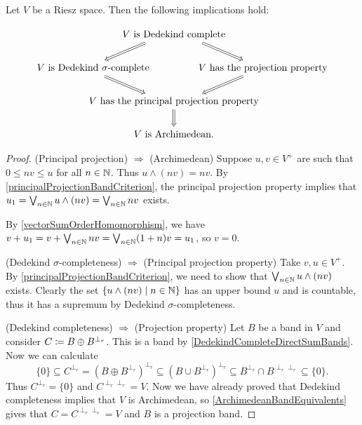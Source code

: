 \begin{proposition}
Let $V$ be a Riesz space. Then the following implications hold:

\[ \begin{tikzcd}[column sep=0]
& \text{$V$ is Dedekind complete} \ar[dl, Rightarrow, end anchor={[xshift=2em]north east}] \ar[dr, Rightarrow, end anchor={[xshift = -2em]north west}] & \\
\text{$V$ is Dedekind $\sigma$-complete} \hspace{-7em} \ar[dr, Rightarrow, start anchor={[xshift=2em]south east}] && \hspace{-7em} \text{$V$ has the projection property} \ar[dl, Rightarrow, start anchor={[xshift=-2em]south west}] \\
& \text{$V$ has the principal projection property} \ar[d, Rightarrow] & \\
& \text{$V$ is Archimedean.} &
\end{tikzcd} \]
\end{proposition}
\begin{proof}
(Principal projection) $\Rightarrow$ (Archimedean) Suppose $u,v\in V^+$ are such that $0\leq nv \leq u$ for all $n\in \mathbb{N}$. Thus $u\wedge (nv) = nv$. By \ref{principalProjectionBandCriterion}, the principal projection property implies that $u_1 = \bigvee_{n\in \mathbb{N}} u\wedge (nv) = \bigvee_{n\in \mathbb{N}}nv$ exists.

By \ref{vectorSumOrderHomomorphism}, we have $v+ u_1 = v+\bigvee_{n\in \mathbb{N}}nv = \bigvee_{n\in \mathbb{N}}(1+n)v = u_1$, so $v = 0$.

(Dedekind $\sigma$-completeness) $\Rightarrow$ (Principal projection property) Take $v, u\in V^+$. By \ref{principalProjectionBandCriterion}, we need to show that $\bigvee_{n\in\mathbb{N}}u\wedge (nv)$ exists. Clearly the set $\setbuilder{u\wedge (nv)}{n\in \N}$ has an upper bound $u$ and is countable, thus it has a supremum by Dedekind $\sigma$-completeness.

(Dedekind completeness) $\Rightarrow$ (Projection property) Let $B$ be a band in $V$ and consider $C \coloneqq B \oplus B^{\perp_r}$. This is a band by \ref{DedekindCompleteDirectSumBands}. Now we can calculate
\[ \{0\} \subseteq C^{\perp_r} = (B\oplus B^{\perp_r})^{\perp_r} \subseteq (B\cup B^{\perp_r})^{\perp_r} \subseteq B^{\perp_r} \cap B^{\perp_r\perp_r} \subseteq \{0\}. \]
Thus $C^{\perp_r} = \{0\}$ and $C^{\perp_r\perp_r} = V$. Now we have already proved that Dedekind completeness implies that $V$ is Archimedean, so \ref{ArchimedeanBandEquivalents} gives that $C= C^{\perp_r\perp_r} = V$ and $B$ is a projection band.
\end{proof}

